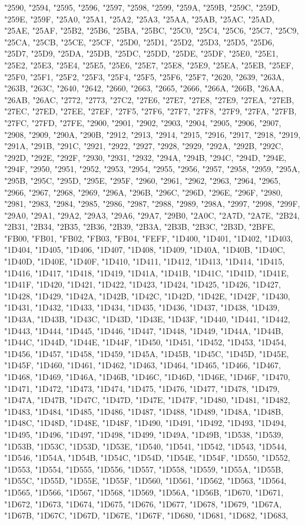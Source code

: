 "2590, "2594, "2595, "2596, "2597, "2598, "2599, "259A, "259B, "259C, "259D, "259E, "259F, "25A0, "25A1, "25A2, "25A3, "25AA, "25AB, "25AC, "25AD, "25AE, "25AF, "25B2, "25B6, "25BA, "25BC, "25C0, "25C4, "25C6, "25C7, "25C9, "25CA, "25CB, "25CE, "25CF, "25D0, "25D1, "25D2, "25D3, "25D5, "25D6, "25D7, "25D9, "25DA, "25DB, "25DC, "25DD, "25DE, "25DF, "25E0, "25E1, "25E2, "25E3, "25E4, "25E5, "25E6, "25E7, "25E8, "25E9, "25EA, "25EB, "25EF, "25F0, "25F1, "25F2, "25F3, "25F4, "25F5, "25F6, "25F7, "2620, "2639, "263A, "263B, "263C, "2640, "2642, "2660, "2663, "2665, "2666, "266A, "266B, "26AA, "26AB, "26AC, "2772, "2773, "27C2, "27E6, "27E7, "27E8, "27E9, "27EA, "27EB, "27EC, "27ED, "27EE, "27EF, "27F5, "27F6, "27F7, "27F8, "27F9, "27FA, "27FB, "27FC, "27FD, "27FE, "2900, "2901, "2902, "2903, "2904, "2905, "2906, "2907, "2908, "2909, "290A, "290B, "2912, "2913, "2914, "2915, "2916, "2917, "2918, "2919, "291A, "291B, "291C, "2921, "2922, "2927, "2928, "2929, "292A, "292B, "292C, "292D, "292E, "292F, "2930, "2931, "2932, "294A, "294B, "294C, "294D, "294E, "294F, "2950, "2951, "2952, "2953, "2954, "2955, "2956, "2957, "2958, "2959, "295A, "295B, "295C, "295D, "295E, "295F, "2960, "2961, "2962, "2963, "2964, "2965, "2966, "2967, "2968, "2969, "296A, "296B, "296C, "296D, "296E, "296F, "2980, "2981, "2983, "2984, "2985, "2986, "2987, "2988, "2989, "298A, "2997, "2998, "299F, "29A0, "29A1, "29A2, "29A3, "29A6, "29A7, "29B0, "2A0C, "2A7D, "2A7E, "2B24, "2B31, "2B34, "2B35, "2B36, "2B39, "2B3A, "2B3B, "2B3C, "2B3D, "2BFE, "FB00, "FB01, "FB02, "FB03, "FB04, "FEFF, "1D400, "1D401, "1D402, "1D403, "1D404, "1D405, "1D406, "1D407, "1D408, "1D409, "1D40A, "1D40B, "1D40C, "1D40D, "1D40E, "1D40F, "1D410, "1D411, "1D412, "1D413, "1D414, "1D415, "1D416, "1D417, "1D418, "1D419, "1D41A, "1D41B, "1D41C, "1D41D, "1D41E, "1D41F, "1D420, "1D421, "1D422, "1D423, "1D424, "1D425, "1D426, "1D427, "1D428, "1D429, "1D42A, "1D42B, "1D42C, "1D42D, "1D42E, "1D42F, "1D430, "1D431, "1D432, "1D433, "1D434, "1D435, "1D436, "1D437, "1D438, "1D439, "1D43A, "1D43B, "1D43C, "1D43D, "1D43E, "1D43F, "1D440, "1D441, "1D442, "1D443, "1D444, "1D445, "1D446, "1D447, "1D448, "1D449, "1D44A, "1D44B, "1D44C, "1D44D, "1D44E, "1D44F, "1D450, "1D451, "1D452, "1D453, "1D454, "1D456, "1D457, "1D458, "1D459, "1D45A, "1D45B, "1D45C, "1D45D, "1D45E, "1D45F, "1D460, "1D461, "1D462, "1D463, "1D464, "1D465, "1D466, "1D467, "1D468, "1D469, "1D46A, "1D46B, "1D46C, "1D46D, "1D46E, "1D46F, "1D470, "1D471, "1D472, "1D473, "1D474, "1D475, "1D476, "1D477, "1D478, "1D479, "1D47A, "1D47B, "1D47C, "1D47D, "1D47E, "1D47F, "1D480, "1D481, "1D482, "1D483, "1D484, "1D485, "1D486, "1D487, "1D488, "1D489, "1D48A, "1D48B, "1D48C, "1D48D, "1D48E, "1D48F, "1D490, "1D491, "1D492, "1D493, "1D494, "1D495, "1D496, "1D497, "1D498, "1D499, "1D49A, "1D49B, "1D538, "1D539, "1D53B, "1D53C, "1D53D, "1D53E, "1D540, "1D541, "1D542, "1D543, "1D544, "1D546, "1D54A, "1D54B, "1D54C, "1D54D, "1D54E, "1D54F, "1D550, "1D552, "1D553, "1D554, "1D555, "1D556, "1D557, "1D558, "1D559, "1D55A, "1D55B, "1D55C, "1D55D, "1D55E, "1D55F, "1D560, "1D561, "1D562, "1D563, "1D564, "1D565, "1D566, "1D567, "1D568, "1D569, "1D56A, "1D56B, "1D670, "1D671, "1D672, "1D673, "1D674, "1D675, "1D676, "1D677, "1D678, "1D679, "1D67A, "1D67B, "1D67C, "1D67D, "1D67E, "1D67F, "1D680, "1D681, "1D682, "1D683, 